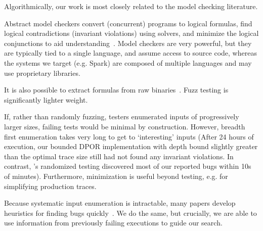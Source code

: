 
 Algorithmically, our work is most closely
related to the model checking literature.

Abstract model checkers convert (concurrent) programs to logical formulas, find
logical contradictions (invariant violations) using solvers, and minimize the logical
conjunctions to aid
understanding~\cite{christ2013flow,khoshnood2015concbugassist,machado2015concurrency}.
Model checkers are very powerful, but they are typically tied to a single
language, and assume access to source code, whereas the systems we target (e.g.
Spark) are composed of multiple languages and may use proprietary
libraries.

It is also possible to extract formulas from raw binaries~\cite{avgerinos2014enhancing}.
Fuzz testing is significantly lighter weight.

If, rather than randomly fuzzing, testers
enumerated inputs of progressively larger sizes, failing tests would
be minimal by construction. However, breadth first enumeration takes very long to get to
`interesting' inputs (After 24 hours of execution, our bounded DPOR
implementation with depth bound slightly greater than the optimal trace size still had not found any invariant violations. In
contrast, \sys's randomized testing discovered
most of our reported bugs within 10s of minutes).
Furthermore, minimization is
useful beyond testing, e.g. for simplifying production traces.

Because systematic input enumeration is intractable, many papers
develop heuristics for finding bugs
quickly~\cite{tzoref2007instrumenting,musuvathi2007iterative,musuvathi2008finding,yabandeh2009crystalball,burckhardt2010randomized,terragnirecontest,fonseca2014ski,leesatapornwongsa2014samc,lin2009modist,park2009ctrigger,coons2010gambit}.
We do the same, but crucially, we are able to use
information from previously failing executions to guide our search.

